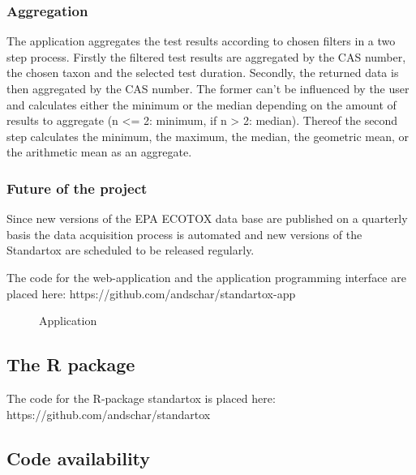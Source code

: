 \subsubsection*{Aggregation}
The \etoxbase{} application aggregates the test results according to chosen filters in a two step process. Firstly the filtered test results are aggregated by the CAS number, the chosen taxon and the selected test duration. Secondly, the returned data is then aggregated by the CAS number. The former can't be influenced by the user and calculates either the minimum or the median depending on the amount of results to aggregate (n <= 2: minimum, if n > 2: median). Thereof the second step calculates the minimum, the maximum, the median, the geometric mean, or the arithmetic mean as an aggregate. 

\subsubsection*{Future of the project}
Since new versions of the EPA ECOTOX data base are published on a quarterly basis the data acquisition process is automated and new versions of the Standartox are scheduled to be released regularly.


The code for the web-application and the application programming interface are placed here: https://github.com/andschar/standartox-app

\begin{figure}
    
    \caption{Application}
    \label{fig:app}
\end{figure}

\subsection*{The R package}

The code for the R-package standartox is placed here: https://github.com/andschar/standartox




\subsection*{Code availability}

